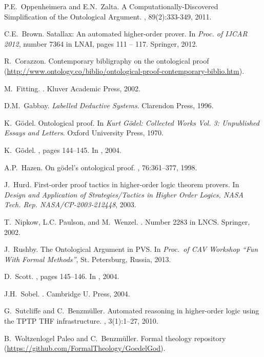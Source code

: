 \documentclass{llncs}
\begin{document}
\begin{thebibliography}{10}
P.E.~Oppenheimera and E.N.~Zalta.
\newblock A Computationally-Discovered Simplification of the Ontological Argument.
, 89(2):333-349, 2011.

C.E.~Brown.
\newblock Satallax: An automated higher-order prover.
\newblock In {\em Proc. of IJCAR 2012}, number 7364 in LNAI, pages 111 -- 117.
  Springer, 2012.

R.~Corazzon.
\newblock Contemporary bibligraphy on the ontological proof
  (\url{http://www.ontology.co/biblio/ontological-proof-contemporary-biblio.htm}).

M.~Fitting.
.
\newblock Kluver Academic Press, 2002.

D.M.~Gabbay. {\em Labelled Deductive Systems}. Clarendon Press, 1996.

K.~G\"odel.
\newblock Ontological proof.
\newblock In {\em {Kurt G\"odel: Collected Works Vol. 3: Unpublished Essays and
  Letters}}. Oxford University Press, 1970.

K.~G\"odel.
, pages 144--145.
\newblock In  \cite{sobel2004logic}, 2004.

A.P.~Hazen.
\newblock On g\"odel's ontological proof.
, 76:361--377, 1998.

J.~Hurd.
\newblock First-order proof tactics in higher-order logic theorem provers.
\newblock In {\em Design and Application of Strategies/Tactics in Higher Order
  Logics, NASA Tech. Rep. NASA/CP-2003-212448}, 2003.

T.~Nipkow, L.C. Paulson, and M.~Wenzel.
.
\newblock Number 2283 in LNCS. Springer, 2002.

J.~Rushby.
\newblock The Ontological Argument in PVS. 
\newblock In {\em Proc.~of CAV Workshop ``Fun With Formal Methods''}, St. Petersburg, Russia, 2013.

D.~Scott.
, pages 145--146.
\newblock In  \cite{sobel2004logic}, 2004.

J.H.~Sobel.
.
\newblock Cambridge U. Press, 2004.

G.~Sutcliffe and C.~Benzm{\"u}ller.
\newblock Automated reasoning in higher-order logic using the {TPTP THF}
  infrastructure.
, 3(1):1--27, 2010.

B.~Woltzenlogel Paleo and C.~Benzm\"uller.
\newblock Formal theology repository
  (\url{https://github.com/FormalTheology/GoedelGod}).
\end{thebibliography}
\end{document}
